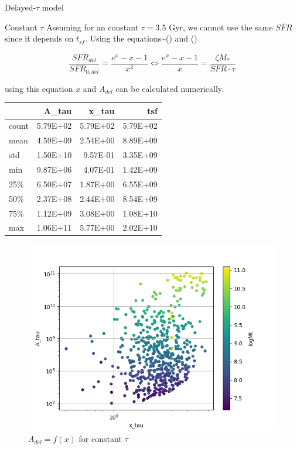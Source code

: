 \documentclass[presentation]{beamer}
\begin{document}
\begin{frame}[label={sec:org05089e9}]{Delayed-\(\tau\) model}
\begin{block}{Constant \(\tau\)}
Assuming for an constant \(\tau=3.5\) Gyr, we cannot use the same \(\overline{SFR}\) since it depends on \(t_{sf}\). Using the equations\textasciitilde{}() and ()

$$
    \frac{\overline{SFR_{del}}}{SFR_{0,del}}=\frac{e^x-x-1}{x^2}\Leftrightarrow \frac{e^x-x-1}{x}=\frac{\zeta M_*}{SFR\cdot\tau}
$$

using this equation \(x\) and \(A_{del}\) can be calculated numerically.




\begin{table}[hc]
\centering
\begin{tabular}{lrrr}
\toprule
{} &    A\_tau &    x\_tau &      tsf \\
\midrule
count & 5.79E+02 & 5.79E+02 & 5.79E+02 \\
mean  & 4.59E+09 & 2.54E+00 & 8.89E+09 \\
std   & 1.50E+10 & 9.57E-01 & 3.35E+09 \\
min   & 9.87E+06 & 4.07E-01 & 1.42E+09 \\
25\%   & 6.50E+07 & 1.87E+00 & 6.55E+09 \\
50\%   & 2.37E+08 & 2.44E+00 & 8.54E+09 \\
75\%   & 1.12E+09 & 3.08E+00 & 1.08E+10 \\
max   & 1.06E+11 & 5.77E+00 & 2.02E+10 \\
\bottomrule
\end{tabular}
\end{table}


\begin{figure}[!htpb]
\centering
\includegraphics[width=.9\linewidth]{./figs/x-A_tau.png}
\caption{\label{fig:$A_{del} = f(x)$ for constant $\tau$}\(A_{del} = f(x)\) for constant \(\tau\)}
\end{figure}




\end{block}
\end{frame}
\end{document}
